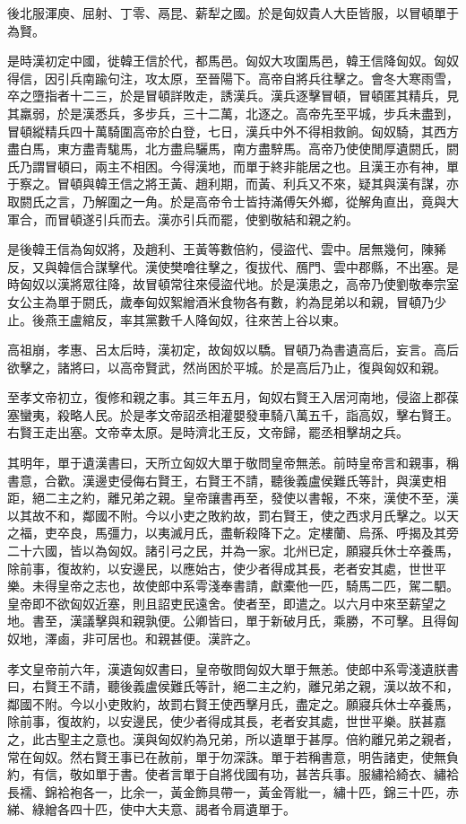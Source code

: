 後北服渾庾、屈射、丁零、鬲昆、薪犁之國。於是匈奴貴人大臣皆服，以冒頓單于為賢。

是時漢初定中國，徙韓王信於代，都馬邑。匈奴大攻圍馬邑，韓王信降匈奴。匈奴得信，因引兵南踰句注，攻太原，至晉陽下。高帝自將兵往擊之。會冬大寒雨雪，卒之墮指者十二三，於是冒頓詳敗走，誘漢兵。漢兵逐擊冒頓，冒頓匿其精兵，見其羸弱，於是漢悉兵，多步兵，三十二萬，北逐之。高帝先至平城，步兵未盡到，冒頓縱精兵四十萬騎圍高帝於白登，七日，漢兵中外不得相救餉。匈奴騎，其西方盡白馬，東方盡青駹馬，北方盡烏驪馬，南方盡騂馬。高帝乃使使閒厚遺閼氏，閼氏乃謂冒頓曰，兩主不相困。今得漢地，而單于終非能居之也。且漢王亦有神，單于察之。冒頓與韓王信之將王黃、趙利期，而黃、利兵又不來，疑其與漢有謀，亦取閼氏之言，乃解圍之一角。於是高帝令士皆持滿傅矢外鄉，從解角直出，竟與大軍合，而冒頓遂引兵而去。漢亦引兵而罷，使劉敬結和親之約。

是後韓王信為匈奴將，及趙利、王黃等數倍約，侵盜代、雲中。居無幾何，陳豨反，又與韓信合謀擊代。漢使樊噲往擊之，復拔代、鴈門、雲中郡縣，不出塞。是時匈奴以漢將眾往降，故冒頓常往來侵盜代地。於是漢患之，高帝乃使劉敬奉宗室女公主為單于閼氏，歲奉匈奴絮繒酒米食物各有數，約為昆弟以和親，冒頓乃少止。後燕王盧綰反，率其黨數千人降匈奴，往來苦上谷以東。

高祖崩，孝惠、呂太后時，漢初定，故匈奴以驕。冒頓乃為書遺高后，妄言。高后欲擊之，諸將曰，以高帝賢武，然尚困於平城。於是高后乃止，復與匈奴和親。

至孝文帝初立，復修和親之事。其三年五月，匈奴右賢王入居河南地，侵盜上郡葆塞蠻夷，殺略人民。於是孝文帝詔丞相灌嬰發車騎八萬五千，詣高奴，擊右賢王。右賢王走出塞。文帝幸太原。是時濟北王反，文帝歸，罷丞相擊胡之兵。

其明年，單于遺漢書曰，天所立匈奴大單于敬問皇帝無恙。前時皇帝言和親事，稱書意，合歡。漢邊吏侵侮右賢王，右賢王不請，聽後義盧侯難氏等計，與漢吏相距，絕二主之約，離兄弟之親。皇帝讓書再至，發使以書報，不來，漢使不至，漢以其故不和，鄰國不附。今以小吏之敗約故，罰右賢王，使之西求月氏擊之。以天之福，吏卒良，馬彊力，以夷滅月氏，盡斬殺降下之。定樓蘭、烏孫、呼揭及其旁二十六國，皆以為匈奴。諸引弓之民，并為一家。北州已定，願寢兵休士卒養馬，除前事，復故約，以安邊民，以應始古，使少者得成其長，老者安其處，世世平樂。未得皇帝之志也，故使郎中系雩淺奉書請，獻橐他一匹，騎馬二匹，駕二駟。皇帝即不欲匈奴近塞，則且詔吏民遠舍。使者至，即遣之。以六月中來至薪望之地。書至，漢議擊與和親孰便。公卿皆曰，單于新破月氏，乘勝，不可擊。且得匈奴地，澤鹵，非可居也。和親甚便。漢許之。

孝文皇帝前六年，漢遺匈奴書曰，皇帝敬問匈奴大單于無恙。使郎中系雩淺遺朕書曰，右賢王不請，聽後義盧侯難氏等計，絕二主之約，離兄弟之親，漢以故不和，鄰國不附。今以小吏敗約，故罰右賢王使西擊月氏，盡定之。願寢兵休士卒養馬，除前事，復故約，以安邊民，使少者得成其長，老者安其處，世世平樂。朕甚嘉之，此古聖主之意也。漢與匈奴約為兄弟，所以遺單于甚厚。倍約離兄弟之親者，常在匈奴。然右賢王事已在赦前，單于勿深誅。單于若稱書意，明告諸吏，使無負約，有信，敬如單于書。使者言單于自將伐國有功，甚苦兵事。服繡袷綺衣、繡袷長襦、錦袷袍各一，比余一，黃金飾具帶一，黃金胥紕一，繡十匹，錦三十匹，赤綈、綠繒各四十匹，使中大夫意、謁者令肩遺單于。

